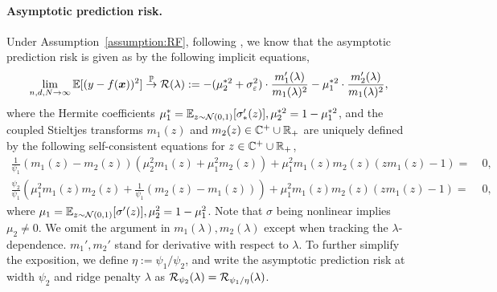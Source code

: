 \paragraph{Asymptotic prediction risk.} 
Under Assumption~\ref{assumption:RF}, following \cite{hu2022universality}, we know that the asymptotic prediction risk is given as by the following implicit equations,  
\begin{align*}
    \lim_{n,d,N\to\infty} \mathbb{E}[(y-f({\boldsymbol x}))^2] \overset{\mathbb{P}}{\to} {\mathcal R}(\lambda) := - (\mu_2^{*2} + \sigma_\varepsilon^2)\cdot \frac{m_1'(\lambda)}{m_1(\lambda)^2} - \mu_1^{*2} \cdot \frac{m_2'(\lambda)}{m_1(\lambda)^2},
\end{align*}
where the Hermite coefficients $\mu_1^* = \mathbb{E}_{z\sim{\mathcal N}(0,1)}[\sigma_*'(z)],  \mu_2^{*2} = 1-\mu_1^{*2}$, and the coupled Stieltjes transforms $m_1(z)$ and $m_2(z)\in\mathbb{C}^+\cup \mathbb{R}_{+}$ are uniquely defined by the following self-consistent equations for $z\in\mathbb{C}^+\cup \mathbb{R}_{+}$,
\begin{align}
    \frac{1}{\psi_1}(m_1(z)-m_2(z))(\mu_2^2m_1(z)+\mu_1^2m_2(z))+\mu_1^2m_1(z)m_2(z)\left(zm_1(z)-1\right)=& ~0, \label{eq:stieltjes1}\\
    \frac{\psi_2}{\psi_1}\left(\mu_1^2m_1(z)m_2(z)+\frac{1}{\psi_1}(m_2(z)-m_1(z))\right)+\mu_1^2m_1(z)m_2(z)\left(zm_1(z)-1\right)=& ~0, \label{eq:stieltjes2}
\end{align}
where $\mu_1 = \mathbb{E}_{z\sim{\mathcal N}(0,1)}[\sigma'(z)], \mu_2^2 = 1-\mu_1^2$. Note that $\sigma$ being nonlinear implies $\mu_2\neq 0$. We omit the argument in $m_1(\lambda),m_2(\lambda)$ except when tracking the $\lambda$-dependence. $m_1',m_2'$ stand for derivative with respect to $\lambda$. 
To further simplify the exposition, we define  $\eta:=\psi_1/\psi_2$, and write the asymptotic prediction risk at width $\psi_2$ and ridge penalty $\lambda$ as ${\mathcal R}_{\psi_2}(\lambda) = {\mathcal R}_{\psi_1/\eta}(\lambda)$. 

